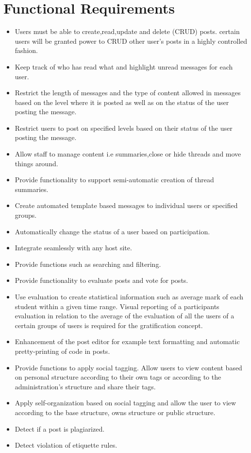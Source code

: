 \documentclass[12pt]{article}
\begin{document}
\section{Functional Requirements}
\begin{itemize}
\item Users must be able to create,read,update and delete (CRUD) posts. certain users will be granted power to CRUD other user's posts in a highly controlled fashion.
\item Keep track of who has read what and highlight unread messages for each user.
\item Restrict the length of messages and the type of content allowed in messages based on the level where it is posted as well as on the status of the user posting the message.
\item Restrict users to post on specified levels based on their status of the user posting the message.
\item Allow staff to manage content i.e summaries,close or hide threads and move things around.
\item Provide functionality to support semi-automatic creation of thread summaries.
\item Create automated template based messages to individual users or specified groups.
\item Automatically change the status of a user based on participation.
\item Integrate seamlessly with any host site.
\item Provide functions such as searching and filtering.
\item Provide functionality to evaluate posts and vote for posts.
\item Use evaluation to create statistical information such as average mark of each student within a given time range. Visual reporting of a participants evaluation in relation to the average of the evaluation of all the users of a certain groups of users is required for the gratification concept.
\item Enhancement of the post editor for example text formatting and automatic pretty-printing of code in posts.
\item Provide functions to apply social tagging. Allow users to view content based on personal structure according to their own tags or according to the administration's  structure and share their tags.
\item Apply self-organization based on social tagging and allow the user to  view according to the base structure, owns structure or public structure.
\item Detect if a post is plagiarized.
\item Detect violation of etiquette rules.
\end{itemize}
\end{document}

